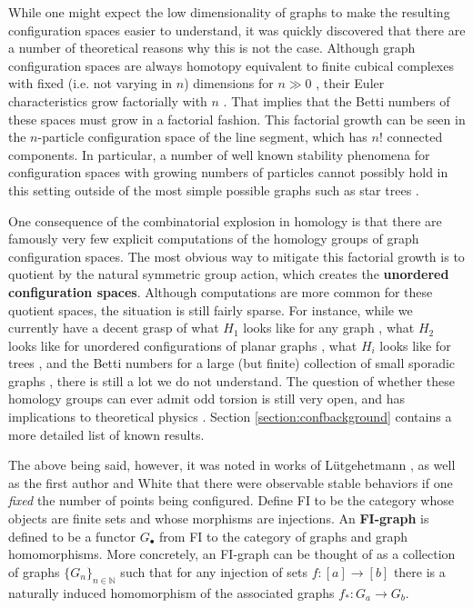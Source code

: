 \documentclass[12pt]{amsart}
\theoremstyle{definition}
\begin{document}
While one might expect the low dimensionality of graphs to make the resulting configuration spaces easier to understand, it was quickly discovered that there are a number of theoretical reasons why this is not the case.
Although graph configuration spaces are always homotopy equivalent to finite cubical complexes with fixed (i.e. not varying in $n$) dimensions
for $n \gg 0$ \cite{Abr,abrams-ghrist,Swia}, their Euler characteristics grow factorially with $n$ \cite{Gal}. That implies that the Betti numbers of these spaces must grow in a factorial fashion.
This factorial growth %
can be seen in the $n$-particle configuration space of the line segment, which has $n!$ connected components. In particular, a number of well known stability phenomena for configuration spaces with growing numbers of particles cannot possibly hold in this setting outside of the most simple possible graphs such as star trees \cite{wawrykow2025homology}.

One consequence of the combinatorial explosion in homology is that there are famously very few explicit computations of the homology groups of graph configuration spaces. The most obvious way to mitigate this factorial growth is to quotient by the natural symmetric group action, which creates the \textbf{unordered configuration spaces}. Although computations are more common for these quotient spaces, the situation is still fairly sparse. For instance, while we currently have a decent grasp of what $H_1$ looks like for any graph \cite{KP}, what $H_2$ looks like for unordered configurations of planar graphs \cite{AK}, what $H_i$ looks like for trees \cite{Farl}, and the Betti numbers for a large (but finite) collection of small sporadic graphs \cite{Drum}, there is still a lot we do not understand. The question of whether these homology groups can ever admit odd torsion is still very open, and has implications to theoretical physics \cite{MS}. Section \ref{section:confbackground} contains a more detailed list of known results.

The above being said, however, it was noted in works of L\"utgehetmann \cite{Lut}, as well as the first author and White \cite{RW} that there were observable stable behaviors if one \emph{fixed} the number of points being configured. Define FI to be the category whose objects are finite sets and whose morphisms are injections. An \textbf{FI-graph} is defined to be a functor $G_\bullet$ from FI to the category of graphs and graph homomorphisms. More concretely, an FI-graph can be thought of as a collection of graphs $\{G_n\}_{n \in \mathbb{N}}$ such that for any injection of sets $f:[a] \rightarrow [b]$ there is a naturally induced homomorphism of the associated graphs $f_\ast:G_a \rightarrow G_b$.
\end{document}
